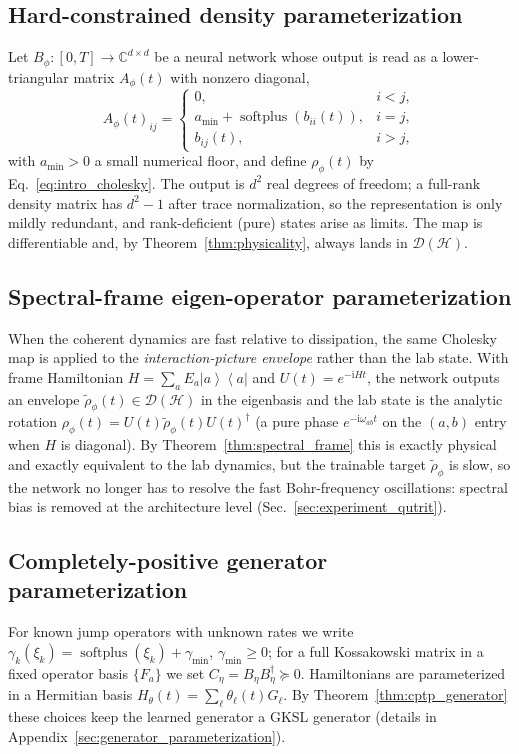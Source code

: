 \documentclass[twocolumn,aps,prxquantum,superscriptaddress,nofootinbib,floatfix,longbibliography]{revtex4-2}
\DeclareMathOperator{\softplus}{softplus}
\newcommand{\C}{\mathbb{C}}
\newcommand{\calD}{\mathcal{D}}
\newcommand{\ii}{\mathrm{i}}
\newcommand{\ket}[1]{\left\lvert #1 \right\rangle}
\newcommand{\bra}[1]{\left\langle #1 \right\rvert}
\newcommand{\proj}[1]{\ket{#1}\!\bra{#1}}
\newcommand{\hilb}{\mathcal{H}}
\newcommand{\rhophi}{\rho_{\phi}}
\begin{document}
\subsection{Hard-constrained density parameterization}
\label{sec:framework_density}
Let $B_\phi:[0,T]\to\C^{d\times d}$ be a neural network whose output is read as a lower-triangular matrix $A_\phi(t)$ with nonzero diagonal,
\begin{equation}
    A_\phi(t)_{ij}=\begin{cases}
        0, & i<j,\\[2pt]
        a_{\min}+\softplus(b_{ii}(t)), & i=j,\\[2pt]
        b_{ij}(t), & i>j,
    \end{cases}
    \label{eq:A_definition}
\end{equation}
with $a_{\min}>0$ a small numerical floor, and define $\rhophi(t)$ by Eq.~\eqref{eq:intro_cholesky}. The output is $d^2$ real degrees of freedom; a full-rank density matrix has $d^2-1$ after trace normalization, so the representation is only mildly redundant, and rank-deficient (pure) states arise as limits. The map is differentiable and, by Theorem~\ref{thm:physicality}, always lands in $\calD(\hilb)$.

\subsection{Spectral-frame eigen-operator parameterization}
\label{sec:framework_spectral}
When the coherent dynamics are fast relative to dissipation, the same Cholesky map is applied to the \emph{interaction-picture envelope} rather than the lab state. With frame Hamiltonian $H=\sum_a E_a\proj{a}$ and $U(t)=e^{-\ii Ht}$, the network outputs an envelope $\widetilde\rho_\phi(t)\in\calD(\hilb)$ in the eigenbasis and the lab state is the analytic rotation $\rhophi(t)=U(t)\widetilde\rho_\phi(t)U(t)^\dagger$ (a pure phase $e^{-\ii\omega_{ab}t}$ on the $(a,b)$ entry when $H$ is diagonal). By Theorem~\ref{thm:spectral_frame} this is exactly physical and exactly equivalent to the lab dynamics, but the trainable target $\widetilde\rho_\phi$ is slow, so the network no longer has to resolve the fast Bohr-frequency oscillations: spectral bias is removed at the architecture level (Sec.~\ref{sec:experiment_qutrit}).

\subsection{Completely-positive generator parameterization}
\label{sec:framework_generator}
For known jump operators with unknown rates we write $\gamma_k(\xi_k)=\softplus(\xi_k)+\gamma_{\min}$, $\gamma_{\min}\ge0$; for a full Kossakowski matrix in a fixed operator basis $\{F_a\}$ we set $C_\eta=B_\eta B_\eta^\dagger\succeq0$. Hamiltonians are parameterized in a Hermitian basis $H_\theta(t)=\sum_\ell\theta_\ell(t)G_\ell$. By Theorem~\ref{thm:cptp_generator} these choices keep the learned generator a GKSL generator (details in Appendix~\ref{sec:generator_parameterization}).
\end{document}
